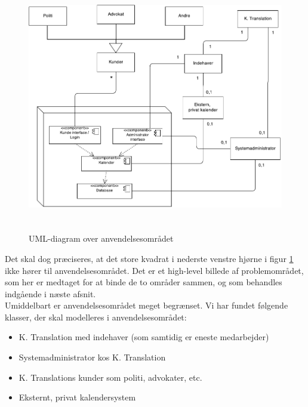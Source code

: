 \documentclass[12pt]{article}
\begin{document}
\begin{figure}[!ht]
\includegraphics[width=12cm, height=11cm]{anvendelsesomr.pdf}
\caption{UML-diagram over anvendelsesområdet}
\label{fig:anvend}
\end{figure}

Det skal dog præciseres, at det store kvadrat i nederste venstre hjørne i figur
\ref{fig:anvend} ikke hører til anvendelsesområdet. Det er et high-level
billede af problemområdet, som her er medtaget for at binde de to områder sammen,
og som behandles indgående i næste afsnit.\\ 
Umiddelbart er anvendelsesområdet meget begrænset. Vi har fundet følgende
klasser, der skal modelleres i anvendelsesområdet:

\begin{itemize}
\item K. Translation med indehaver (som samtidig er eneste medarbejder)
\item Systemadministrator kos K. Translation
\item K. Translations kunder som politi, advokater, etc.
\item Eksternt, privat kalendersystem 
\end{itemize}
\end{document}
